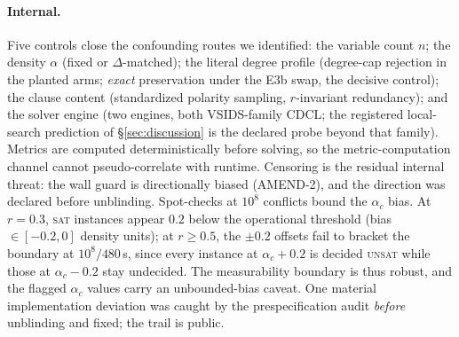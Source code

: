 \documentclass[manuscript, screen, review]{jair}
\begin{document}
\paragraph{Internal.}
Five controls close the confounding routes we identified: the variable count
$n$; the density $\alpha$ (fixed or $\Delta$-matched); the literal degree
profile (degree-cap rejection in the planted arms; \emph{exact} preservation
under the E3b swap, the decisive control); the clause content (standardized
polarity sampling, $r$-invariant redundancy); and the solver engine (two
engines, both VSIDS-family CDCL; the registered local-search prediction of
\S\ref{sec:discussion} is the declared probe beyond that family). Metrics are computed deterministically before solving, so the
metric-computation channel cannot pseudo-correlate with runtime. Censoring is
the residual internal threat: the wall guard is directionally biased
(AMEND-2), and the direction was declared before unblinding. Spot-checks at
$10^8$ conflicts bound the $\alpha_c$ bias. At $r=0.3$, \textsc{sat}
instances appear $0.2$ below the operational threshold (bias $\in[-0.2,0]$
density units); at $r\ge0.5$, the $\pm0.2$ offsets fail to bracket the
boundary at $10^8/480$\,s, since every instance at $\alpha_c+0.2$ is decided
\textsc{unsat} while those at $\alpha_c-0.2$ stay undecided. The
measurability boundary is thus robust, and the flagged $\alpha_c$ values
carry an unbounded-bias caveat.
One material implementation
deviation was caught by the prespecification audit \emph{before} unblinding
and fixed; the trail is public.
\end{document}
